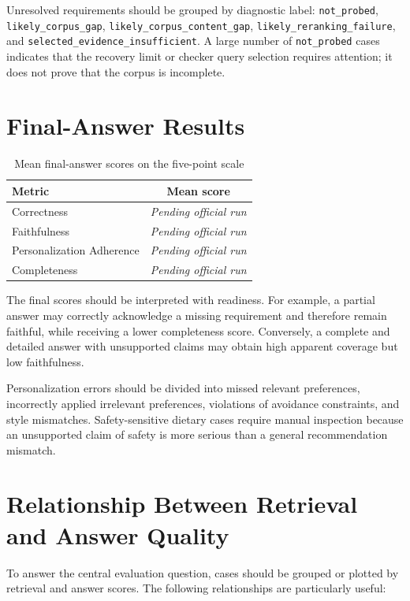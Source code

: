 Unresolved requirements should be grouped by diagnostic label:
\texttt{not\_probed}, \texttt{likely\_corpus\_gap},
\texttt{likely\_corpus\_content\_gap},
\texttt{likely\_reranking\_failure}, and
\texttt{selected\_evidence\_insufficient}. A large number of
\texttt{not\_probed} cases indicates that the recovery limit or checker query
selection requires attention; it does not prove that the corpus is incomplete.

\section{Final-Answer Results}

\begin{table}[H]
\centering
\caption{Mean final-answer scores on the five-point scale}
\label{tab:answer-results}
\begin{tabular}{lc}
\hline
\textbf{Metric} & \textbf{Mean score} \\
\hline
Correctness & \textit{Pending official run} \\
Faithfulness & \textit{Pending official run} \\
Personalization Adherence & \textit{Pending official run} \\
Completeness & \textit{Pending official run} \\
\hline
\end{tabular}
\end{table}

The final scores should be interpreted with readiness. For example, a partial
answer may correctly acknowledge a missing requirement and therefore remain
faithful, while receiving a lower completeness score. Conversely, a complete
and detailed answer with unsupported claims may obtain high apparent coverage
but low faithfulness.

Personalization errors should be divided into missed relevant preferences,
incorrectly applied irrelevant preferences, violations of avoidance
constraints, and style mismatches. Safety-sensitive dietary cases require
manual inspection because an unsupported claim of safety is more serious than
a general recommendation mismatch.

\section{Relationship Between Retrieval and Answer Quality}

To answer the central evaluation question, cases should be grouped or plotted
by retrieval and answer scores. The following relationships are particularly
useful:

